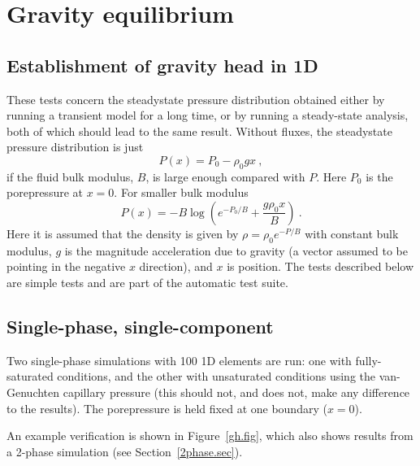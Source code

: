 \chapter{Gravity equilibrium}
\section{Establishment of gravity head in 1D}

These tests concern the steadystate pressure distribution obtained
either by running a transient model for a long time, or by running a
steady-state analysis, both of which should lead to the same result.
Without fluxes, the steadystate pressure distribution is just
\begin{equation}
P(x) = P_{0} - \rho_{0} g x \ ,
\end{equation}
if the fluid bulk modulus, $B$, is large enough compared with $P$.
Here $P_{0}$ is the porepressure at $x=0$.  For smaller bulk modulus
\begin{equation}
P(x) = -B \log\left( e^{-P_{0}/B} + \frac{g\rho_{0}x}{B} \right) \ .
\label{grav.head.eqn}
\end{equation}
Here it is assumed that the density is given by $\rho = \rho_{0}e^{-P/B}$
with constant bulk modulus, $g$ is the
magnitude acceleration due to gravity (a vector assumed to be pointing in the
negative $x$ direction), and $x$ is position.  The tests described below
are simple tests and are part of the automatic test suite.

\section{Single-phase, single-component}
\label{1phase1comp.sec}

Two single-phase simulations with 100 1D elements are run: one with
fully-saturated conditions, and the other with unsaturated conditions
using the van-Genuchten capillary pressure (this should not, and does
not, make any difference to the results).  The porepressure is held
fixed at one boundary ($x=0$).

An example verification is shown in Figure~\ref{gh.fig}, which also
shows results from a 2-phase simulation (see Section~\ref{2phase.sec}).

